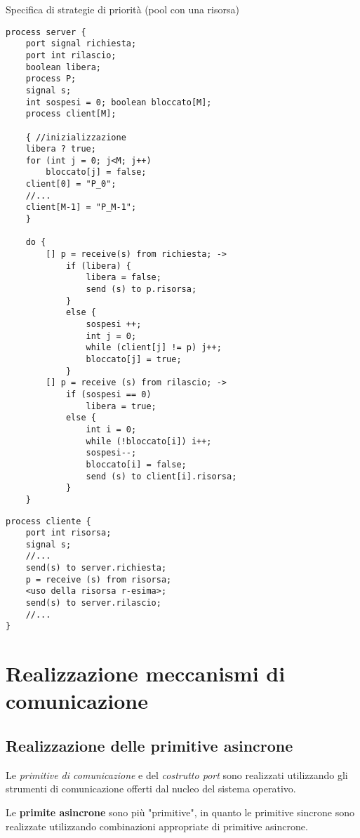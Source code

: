 Specifica di strategie di priorità (pool con una risorsa)
\begin{verbatim}
process server {
    port signal richiesta;
    port int rilascio;
    boolean libera;
    process P;
    signal s;
    int sospesi = 0; boolean bloccato[M];
    process client[M];

    { //inizializzazione
    libera ? true;
    for (int j = 0; j<M; j++)
        bloccato[j] = false;
    client[0] = "P_0"; 
    //...
    client[M-1] = "P_M-1";
    }

    do {
        [] p = receive(s) from richiesta; ->
            if (libera) {
                libera = false;
                send (s) to p.risorsa;
            }
            else {
                sospesi ++;
                int j = 0;
                while (client[j] != p) j++;
                bloccato[j] = true;
            }
        [] p = receive (s) from rilascio; ->
            if (sospesi == 0)
                libera = true;
            else {
                int i = 0;
                while (!bloccato[i]) i++;
                sospesi--;
                bloccato[i] = false;
                send (s) to client[i].risorsa;
            }
    }
\end{verbatim}

\begin{verbatim}
process cliente {
    port int risorsa;
    signal s;
    //...
    send(s) to server.richiesta;
    p = receive (s) from risorsa;
    <uso della risorsa r-esima>;
    send(s) to server.rilascio;
    //...
}
\end{verbatim}

\section{Realizzazione meccanismi di comunicazione}

\subsection{Realizzazione delle primitive asincrone}
Le \textit{primitive di comunicazione} e del \textit{costrutto port} sono realizzati utilizzando gli strumenti di comunicazione offerti dal nucleo del sistema operativo.

Le \textbf{primite asincrone} sono più "primitive", in quanto le primitive sincrone sono realizzate utilizzando combinazioni appropriate di primitive asincrone.

